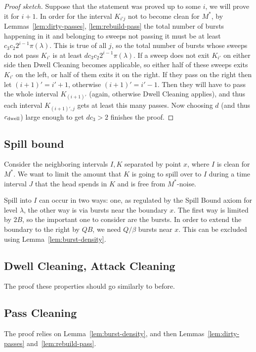 \documentclass[12pt]{memoir}
\def\B{B}
\newcommand{\Q}{Q}
\newcommand{\Cns}[2]{#1_{\textrm{\upshape #2}}}
\newcommand{\cns}[1]{\Cns{c}{#1}}
\newcommand{\cDwell}{\cns{dwell}}
\begin{document}
\begin{proof}[Proof sketch]
Suppose that the statement was proved up to some \( i \), we will prove it for \( i+1 \).
In order for the interval \( K_{i'j} \) not to become clean for \( M^{*} \), 
by Lemmas~\ref{lem:dirty-passes}, \ref{lem:rebuild-pass}
the total number of bursts happening in it and belonging to sweeps not 
passing it must be at least \( c_{3}c_{2} 2^{i-1}\pi(\lambda) \).
This is true of all \( j \), so the total number of bursts whose sweeps do not pass \( K_{i'} \)
is at least \( d c_{3}c_{2} 2^{i-1}\pi(\lambda) \).
If a sweep does not exit \( K_{i'} \) on either side then Dwell Cleaning becomes applicable,
so either half of these sweeps exits \( K_{i'} \) on the left, or half of them exits it on the right.
If they pass on the right then let \( (i+1)'=i'+1 \), otherwise \( (i+1)'=i'-1 \).
Then they will have to pass the whole interval \( K_{(i+1)'} \) (again, otherwise Dwell Cleaning
applies), and thus each interval \( K_{(i+1)',j} \) gets at least this many passes.
Now choosing \( d \) (and thus \( \cDwell \)) large enough 
to get \( d c_{3}>2 \) finishes the proof.
\end{proof}


\subsection{Spill bound}

Consider the neighboring intervals \( I,K \) separated by point \( x \),
where \( I \) is clean for \( M^{*} \).
We want to limit the amount that \( K \) is going to spill over to \( I \) during a time
interval \( J \) that the head spends in \( K \) and is free from \( M^{*} \)-noise.

Spill into \( I \) can occur in two ways: one, as regulated by the Spill Bound axiom
for level \( \lambda \), the other way is via bursts near the boundary \( x \).
The first way is limited by \( 2\B \), so the important one to consider are the bursts.
In order to extend the boundary to the right by \( \Q\B \),
we need \( \Q/\beta \) bursts near \( x \).
This can be excluded using Lemma~\ref{lem:burst-density}.

\subsection{Dwell Cleaning, Attack Cleaning}

The proof these properties should go similarly to before.

\subsection{Pass Cleaning}

The proof relies on Lemma~\ref{lem:burst-density}, and then 
Lemmas~\ref{lem:dirty-passes} and~\ref{lem:rebuild-pass}.
\end{document}
